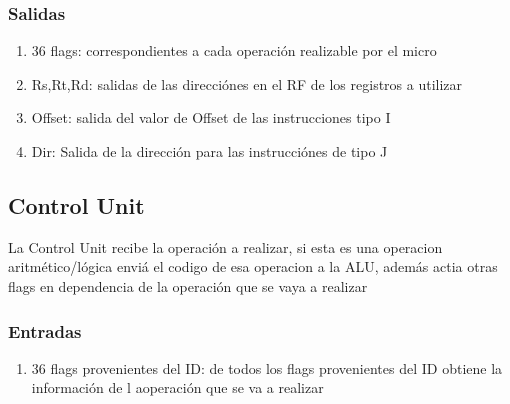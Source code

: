 \documentclass{article}
\begin{document}
            \subsubsection{Salidas}
            \begin{enumerate}
                \item 36 flags: correspondientes a cada operaci\'on realizable por el micro
                \item Rs,Rt,Rd: salidas de las direcci\'ones en el RF de los registros a utilizar
                \item Offset: salida del valor de Offset de las instrucciones tipo I
                \item Dir: Salida de la direcci\'on para las instrucci\'ones de tipo J
            \end{enumerate}

        \subsection{Control Unit}
        \label{sec:CU}
            La Control Unit recibe la operaci\'on a realizar, si esta es una operacion aritm\'etico/l\'ogica envi\'a el codigo de esa operacion a la ALU, adem\'as actia otras flags en dependencia de la operaci\'on que se vaya a realizar

            \subsubsection{Entradas}
            \begin{enumerate}
                \item 36 flags provenientes del ID: de todos los flags provenientes del ID obtiene la informaci\'on de l aoperaci\'on que se va a realizar
            \end{enumerate}
\end{document}

